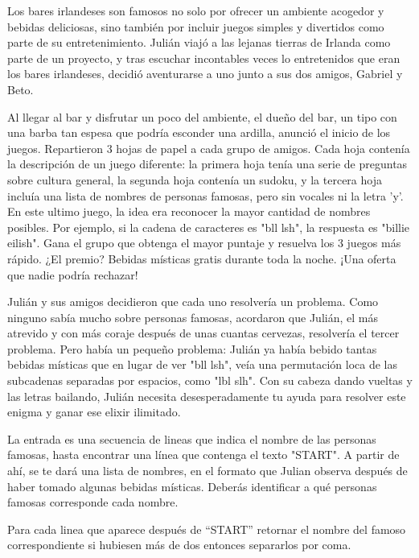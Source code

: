 
Los bares irlandeses son famosos no solo por ofrecer un ambiente acogedor y bebidas deliciosas, sino también por incluir juegos simples y divertidos como parte de su entretenimiento. Julián viajó a las lejanas tierras de Irlanda como parte de un proyecto, y tras escuchar incontables veces lo entretenidos que eran los bares irlandeses, decidió aventurarse a uno junto a sus dos amigos, Gabriel y Beto.

Al llegar al bar y disfrutar un poco del ambiente, el dueño del bar, un tipo con una barba tan espesa que podría esconder una ardilla, anunció el inicio de los juegos. Repartieron $3$ hojas de papel a cada grupo de amigos. Cada hoja contenía la descripción de un juego diferente: la primera hoja tenía una serie de preguntas sobre cultura general, la segunda hoja contenía un sudoku, y la tercera hoja incluía una lista de nombres de personas famosas, pero sin vocales ni la letra 'y'. En este ultimo juego, la idea era reconocer la mayor cantidad de nombres posibles. Por ejemplo, si la cadena de caracteres es "bll lsh", la respuesta es "billie eilish". Gana el grupo que obtenga el mayor puntaje y resuelva los 3 juegos más rápido. ¿El premio? Bebidas místicas gratis durante toda la noche. ¡Una oferta que nadie podría rechazar!

Julián y sus amigos decidieron que cada uno resolvería un problema. Como ninguno sabía mucho sobre personas famosas, acordaron que Julián, el más atrevido y con más coraje después de unas cuantas cervezas, resolvería el tercer problema. Pero había un pequeño problema: Julián ya había bebido tantas bebidas místicas que en lugar de ver "bll lsh", veía una permutación loca de las subcadenas separadas por espacios, como "lbl slh". Con su cabeza dando vueltas y las letras bailando, Julián necesita desesperadamente tu ayuda para resolver este enigma y ganar ese elixir ilimitado.


La entrada es una secuencia de lineas que indica el nombre de las personas famosas, hasta encontrar una línea que contenga el texto "START". A partir de ahí, se te dará una lista de nombres, en el formato que Julian observa después de haber tomado algunas bebidas místicas. Deberás identificar a qué personas famosas corresponde cada nombre.

\outputText

Para cada linea que aparece después de “START” retornar el nombre del famoso correspondiente si hubiesen más de dos entonces separarlos por coma.

\exampleCases

\begin{example}
\end{example}
